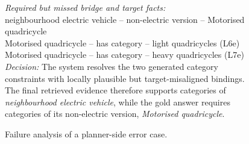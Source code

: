 \documentclass{article}
\theoremstyle{plain}
\theoremstyle{definition}
\theoremstyle{remark}
\begin{document}
\begin{figure}[h]
{{{{\textit{Required but missed bridge and target facts:}\\
neighbourhood electric vehicle \;--\; non-electric version \;--\; Motorised quadricycle\\
Motorised quadricycle \;--\; has category \;--\; light quadricycles (L6e)\\
Motorised quadricycle \;--\; has category \;--\; heavy quadricycles (L7e)\\[0.3em]

\textit{Decision:} The system resolves the two generated category constraints with locally plausible but target-misaligned bindings. 
The final retrieved evidence therefore supports categories of \emph{neighbourhood electric vehicle}, while the gold answer requires categories of its non-electric version, \emph{Motorised quadricycle}.
}}

\vspace{0.6em}

}
}

\caption{Failure analysis of a planner-side error case.}
\label{fig:failure_planner}
\end{figure}
\end{document}

